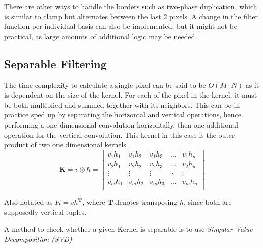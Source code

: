 \documentclass[twoside,a4paper,article]{combine}
\begin{document}
There are other ways to handle the borders such as two-phase duplication,
which is similar to clamp but alternates between the last 2 pixels.
A change in the filter function per individual basis can also be implemented, but it might not be practical,
as large amounts of additional logic may be needed\cite{BaileyAmbikumar18}.

\subsection{Separable Filtering}
The time complexity to calculate a single pixel can be said to be $O(M \cdot N)$ as it is dependent
on the size of the kernel. For each of the pixel in the kernel, it must be both multiplied and summed together
with its neighbors. This can be in practice sped up by separating the horizontal and vertical operations, hence performing
a one dimensional convolution horizontally, then one additional operation for the vertical convolution. This kernel in this case is the
outer product of two one dimensional kernels\cite{Szeliski_2022}. 
\[
    \boldsymbol{K} = v \otimes h = 
    \begin{bmatrix}
        v_1h_1 & v_1h_2 & v_1 h_3 & \hdots & v_1h_n \\
        v_2h_1 & v_2h_2 & v_2 h_3 & \hdots & v_2h_n \\
        \vdots & \vdots & \vdots & \ddots & \vdots \\
        v_m h_1 & v_m h_2 & v_m h_3 & \hdots & v_m h_n \\
    \end{bmatrix}
\]

Also notated as $K=vh^{\boldsymbol{T}}$, where $\boldsymbol{T}$ denotes transposing $h$, since both are supposedly vertical tuples.

A method to check whether a given Kernel is separable is to use \emph{Singular Value Decomposition (SVD)} \cite{Szeliski_2022}
\end{document}
